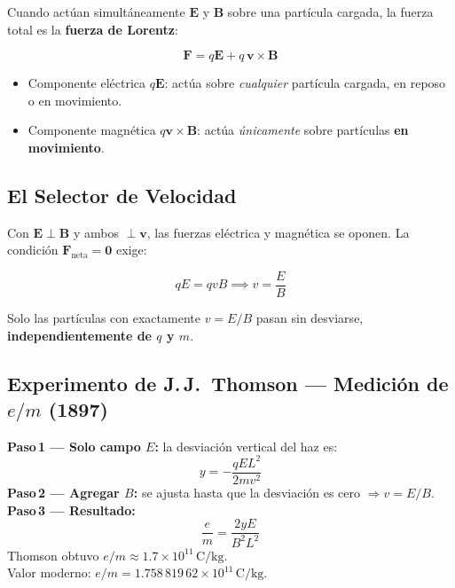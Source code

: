\documentclass[12pt, letterpaper]{report}
\numberwithin{equation}{section}
\newcommand{\vB}[1]{\boldsymbol{#1}}          %
\newcommand{\un}[1]{\,\mathrm{#1}}            %
\begin{document}
Cuando actúan simultáneamente $\vB{E}$ y $\vB{B}$ sobre una partícula
cargada, la fuerza total es la \textbf{fuerza de Lorentz}:

\begin{equation}
  \boxed{\vB{F} = q\vB{E} + q\,\vB{v}\times\vB{B}}
  \label{eq:Lorentz}
\end{equation}

\begin{itemize}[leftmargin=1.8em, itemsep=2pt]
  \item Componente eléctrica $q\vB{E}$: actúa sobre \textit{cualquier}
        partícula cargada, en reposo o en movimiento.
  \item Componente magnética $q\vB{v}\times\vB{B}$: actúa
        \textit{únicamente} sobre partículas \textbf{en movimiento}.
\end{itemize}

\subsection{El Selector de Velocidad}

Con $\vB{E}\perp\vB{B}$ y ambos $\perp\vB{v}$, las fuerzas eléctrica y
magnética se oponen. La condición $\vB{F}_\text{neta}=\vB{0}$ exige:

\begin{equation}
  qE = qvB \implies
  \boxed{v = \frac{E}{B}}
  \label{eq:selectorv}
\end{equation}

Solo las partículas con exactamente $v=E/B$ pasan sin desviarse,
\textbf{independientemente de $q$ y $m$}.

\subsection{Experimento de J.\,J.\ Thomson — Medición de \texorpdfstring{$e/m$}{e/m} (1897)}

\begin{tcolorbox}[exbox, title=Procedimiento de Thomson]
  \textbf{Paso\,1 — Solo campo $E$:} la desviación vertical del haz es:
  \begin{equation}
    y = -\frac{qEL^2}{2mv^2}
    \label{eq:Thomson1}
  \end{equation}
  \textbf{Paso\,2 — Agregar $B$:} se ajusta hasta que la desviación es
  cero $\Rightarrow v=E/B$.\\[5pt]
  \textbf{Paso\,3 — Resultado:}
  \begin{equation}
    \boxed{\frac{e}{m} = \frac{2yE}{B^2L^2}}
    \label{eq:Thomson2}
  \end{equation}
  Thomson obtuvo $e/m\approx1.7\times10^{11}\un{C/kg}$.\\
  Valor moderno: $e/m=1.758\,819\,62\times10^{11}\un{C/kg}$.
\end{tcolorbox}
\end{document}
